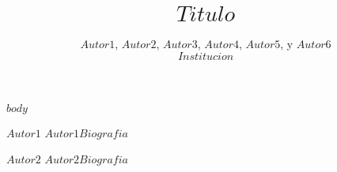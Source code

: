 \documentclass[12pt,journal,compsoc]{IEEEtran}
\begin{document}
\spanishsignitems
%
\title{$Titulo$}

\author{$Autor1$,
        $Autor2$,
        $Autor3$,
        $Autor4$,
        $Autor5$,
        y $Autor6$ \\ \textit{$Institucion$}%
}






\maketitle


\IEEEdisplaynontitleabstractindextext
\IEEEpeerreviewmaketitle

$body$









\begin{IEEEbiographynophoto}{$Autor1$}
$Autor1Biografia$
\end{IEEEbiographynophoto}

\begin{IEEEbiographynophoto}{$Autor2$}
$Autor2Biografia$
\end{IEEEbiographynophoto}
\end{document}
